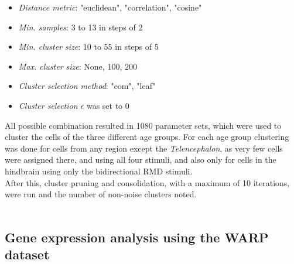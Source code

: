 \documentclass[12pt, a4paper, oneside]{article}
\begin{document}
\begin{itemize}[itemsep=0.25pt]
	\item \textit{Distance metric}: "euclidean", "correlation", "cosine"
	\item \textit{Min. samples}: 3 to 13 in steps of 2
	\item \textit{Min. cluster size}: 10 to 55 in steps of 5
	\item \textit{Max. cluster size}: None, 100, 200
	\item \textit{Cluster selection method}: "eom", "leaf"
	\item \textit{Cluster selection $\epsilon$} was set to 0
\end{itemize}
All possible combination resulted in 1080 parameter sets, which were used to cluster the cells of the three different age groups. For each age group clustering was done for cells from any region except the \textit{Telencephalon}, as very few cells were assigned there, and using all four stimuli, and also only for cells in the hindbrain using only the bidirectional RMD stimuli.\\
After this, cluster pruning and consolidation, with a maximum of 10 iterations, were run and the number of non-noise clusters noted.\\
\\


\subsection{Gene expression analysis using the WARP dataset}
\end{document}
